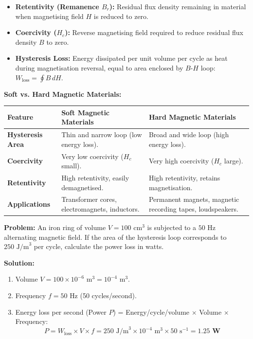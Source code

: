 \documentclass[12pt,a4paper]{article}
\begin{document}
\begin{tcolorbox}[defbox, title={\textbf{Hysteresis Terminology}}]
\begin{itemize}[leftmargin=*, itemsep=2pt]
  \item \textbf{Retentivity (Remanence $B_r$):} Residual flux density remaining in material when magnetising field $H$ is reduced to zero.
  \item \textbf{Coercivity ($H_c$):} Reverse magnetising field required to reduce residual flux density $B$ to zero.
  \item \textbf{Hysteresis Loss:} Energy dissipated per unit volume per cycle as heat during magnetisation reversal, equal to area enclosed by $B$-$H$ loop: $W_{\text{loss}} = \oint B \, dH$.
\end{itemize}
\end{tcolorbox}

\textbf{Soft vs. Hard Magnetic Materials:}\par\vspace{6pt}\noindent
\begin{tabularx}{\linewidth}{|B{3.2cm}|Y|Y|}
\hline
\textbf{Feature} & \textbf{Soft Magnetic Materials} & \textbf{Hard Magnetic Materials} \\
\hline
\textbf{Hysteresis Area} & Thin and narrow loop (low energy loss). & Broad and wide loop (high energy loss). \\
\hline
\textbf{Coercivity} & Very low coercivity ($H_c$ small). & Very high coercivity ($H_c$ large). \\
\hline
\textbf{Retentivity} & High retentivity, easily demagnetised. & High retentivity, retains magnetisation. \\
\hline
\textbf{Applications} & Transformer cores, electromagnets, inductors. & Permanent magnets, magnetic recording tapes, loudspeakers. \\
\hline
\end{tabularx}

\begin{tcolorbox}[examplebox, title={\textbf{Solved Problem 2: Hysteresis Loss Power Dissipation}}]
\textbf{Problem:} An iron ring of volume $V = 100\text{ cm}^3$ is subjected to a $50\text{ Hz}$ alternating magnetic field. If the area of the hysteresis loop corresponds to $250\text{ J/m}^3$ per cycle, calculate the power loss in watts.

\textbf{Solution:}\par\noindent
\begin{enumerate}[leftmargin=*, itemsep=2pt]
  \item Volume $V = 100 \times 10^{-6}\text{ m}^3 = 10^{-4}\text{ m}^3$.
  \item Frequency $f = 50\text{ Hz}$ (50 cycles/second).
  \item Energy loss per second (Power $P$) = Energy/cycle/volume $\times$ Volume $\times$ Frequency:
   \begin{equation}
   P = W_{\text{loss}} \times V \times f = 250\text{ J/m}^3 \times 10^{-4}\text{ m}^3 \times 50\text{ s}^{-1} = \mathbf{1.25\text{ W}}
   \end{equation}
\end{enumerate}
\end{tcolorbox}
\end{document}
